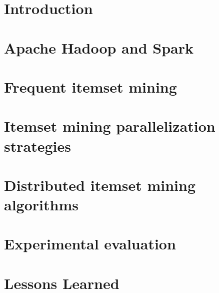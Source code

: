 \documentclass[preprint,review,12pt]{elsarticle}
\begin{document}
\section{Introduction}
\label{Introduction}


\section{Apache Hadoop and Spark}
\label{bigdata}



\section{Frequent itemset mining}
\label{Preliminaries}



\section{Itemset mining parallelization strategies}
\label{parallelization}


%


\section{Distributed itemset mining algorithms}
\label{algorithms}



%



%
%

%




\section{Experimental evaluation}
\label{experimental}


\section{Lessons Learned}
\label{lesson}

\end{document}
